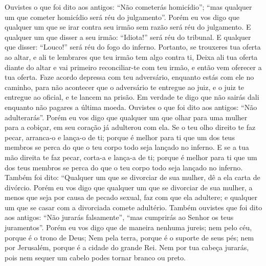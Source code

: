 {  Ouvistes o que foi dito aos antigos: “Não cometerás homicídio”;
 “mas qualquer um que cometer homicídio será réu do julgamento”.
  Porém eu vos digo que qualquer um que se irar contra seu irmão sem razão será réu do julgamento. E qualquer um que disser a seu irmão: “Idiota!” será réu do tribunal.
 E qualquer que
{} disser: “Louco!” será réu do fogo do inferno.
  Portanto, se trouxeres tua oferta ao altar, e ali te lembrares que teu irmão tem algo contra ti,
  Deixa ali tua oferta diante do altar e vai primeiro reconciliar-te com teu irmão, e então vem oferecer a tua oferta.
  Faze acordo depressa com teu adversário, enquanto estás com ele no caminho, para não acontecer que o adversário te entregue ao juiz, e o juiz te entregue ao oficial, e te lancem na prisão.
  Em verdade te digo que não sairás dali enquanto não pagares a última moeda.
  Ouvistes o que foi dito aos antigos: “Não adulterarás”.
{}
  Porém eu vos digo que qualquer um que olhar para uma mulher para a cobiçar, em seu coração já adulterou com ela.
  Se o teu olho direito te faz pecar,
 arranca-o e lança-o de ti; porque é melhor para ti que um dos teus membros se perca do que o teu corpo todo seja lançado no inferno.
  E se a tua mão direita te faz pecar, corta-a e lança-a de ti; porque é melhor para ti que um dos teus membros se perca do que o teu corpo todo seja lançado no inferno.
  Também foi dito: “Qualquer um que se divorciar de sua mulher, dê a ela carta de divórcio.
{}
  Porém eu vos digo que qualquer um que se divorciar de sua mulher, a menos que seja por causa de pecado sexual, faz com que ela adultere; e qualquer um que se casar com a divorciada comete adultério.
  Também ouvistes que foi dito aos antigos: “Não jurarás falsamente”, “mas cumprirás ao Senhor os teus juramentos”.
{}
  Porém eu vos digo que de maneira nenhuma jureis; nem pelo céu, porque é o trono de Deus;
  Nem pela terra, porque é o suporte de seus pés; nem por Jerusalém, porque é a cidade do grande Rei.
  Nem por tua cabeça jurarás, pois nem sequer um cabelo podes tornar branco ou preto.
}
